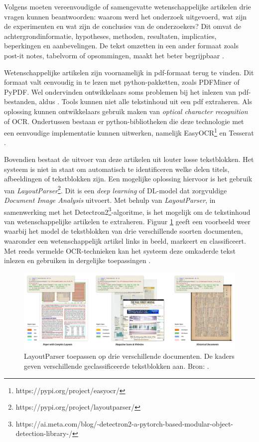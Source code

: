 \medspace

Volgens \textcite{Hollenkamp2020} moeten vereenvoudigde of samengevatte wetenschappelijke artikelen drie vragen kunnen beantwoorden: waarom werd het onderzoek uitgevoerd, wat zijn de experimenten en wat zijn de conclusies van de onderzoekers? Dit omvat de achtergrondinformatie, hypotheses, methoden, resultaten, implicaties, beperkingen en aanbevelingen. De tekst omzetten in een ander formaat zoals post-it notes, tabelvorm of opsommingen, maakt het beter begrijpbaar \autocite{Rijkhoff2022}. 

\medspace

Wetenschappelijke artikelen zijn voornamelijk in pdf-formaat terug te vinden. Dit formaat valt eenvoudig in te lezen met python-pakketten, zoals PDFMiner of PyPDF. Wel ondervinden ontwikkelaars soms problemen bij het inlezen van pdf-bestanden, aldus \textcite{Lee2021}. Tools kunnen niet alle tekstinhoud uit een pdf extraheren. Als oplossing kunnen ontwikkelaars gebruik maken van \textit{optical character recognition} of OCR. Ondertussen bestaan er python-bibliotheken die deze technologie met een eenvoudige implementatie kunnen uitwerken, namelijk EasyOCR\footnote{https://pypi.org/project/easyocr/} en Tesserat \autocite{Lee2021}.

\medspace

Bovendien bestaat de uitvoer van deze artikelen uit louter losse tekstblokken. Het systeem is niet in staat om automatisch te identificeren welke delen titels, afbeeldingen of tekstblokken zijn. Een mogelijke oplossing hiervoor is het gebruik van \textit{LayoutParser}\footnote{https://pypi.org/project/layoutparser/}. Dit is een \textit{deep learning} of DL-model dat zorgvuldige \textit{Document Image Analysis} uitvoert. Met behulp van \textit{LayoutParser}, in samenwerking met het Detectron2\footnote{https://ai.meta.com/blog/-detectron2-a-pytorch-based-modular-object-detection-library-/}-algoritme, is het mogelijk om de tekstinhoud van wetenschappelijke artikelen te extraheren. Figuur \ref{img:layoutparser} geeft een voorbeeld weer waarbij het model de tekstblokken van drie verschillende soorten documenten, waaronder een wetenschappelijk artikel links in beeld, markeert en classificeert. Met reeds vermelde OCR-technieken kan het systeem deze omkaderde tekst inlezen en gebruiken in dergelijke toepassingen \autocite{Shen2021}.

\begin{figure}[H]
	\includegraphics[width=\linewidth]{img/layoutparser.png}
	\caption{LayoutParser toepassen op drie verschillende documenten. De kaders geven verschillende geclassificeerde tekstblokken aan. Bron: \autocite{Shen2021}.}
	\label{img:layoutparser}
\end{figure} 

